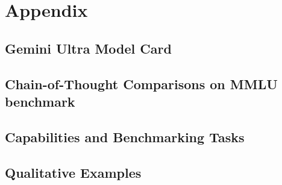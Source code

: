 \documentclass[11pt, letterpaper, logo, onecolumn, copyright, numbering]{googledeepmind}
\begin{document}
\section{Appendix}
\subsection{Gemini Ultra Model Card}
\label{app:model-card}


\subsection{Chain-of-Thought Comparisons on MMLU benchmark}
\label{app:mmlu}


\pagebreak
\subsection{Capabilities and Benchmarking Tasks}
\label{app:tasks}


\pagebreak\subsection{Qualitative Examples}
\label{app:demos}

\end{document}
